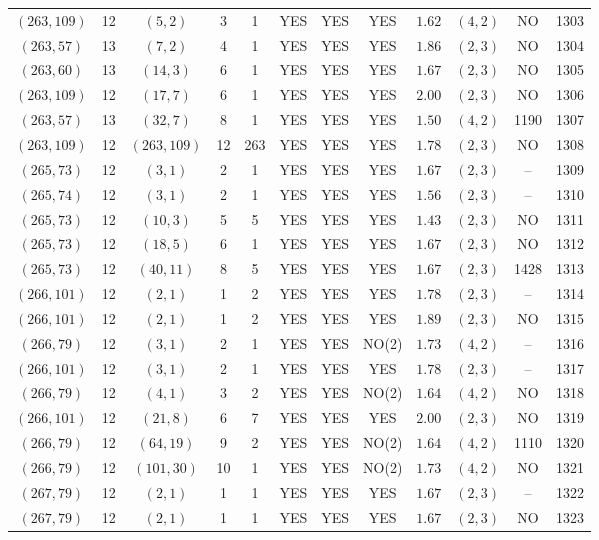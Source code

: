 \begin{longtable}{|c|c|c|c|c|c|c|c|c|c|c|c|}
$(263,109)$ & 12 & $(5,2)$ & 3 & 1 & YES & YES & YES & $1.62$ & $(4,2)$ & NO & 1303\\
$(263,57)$ & 13 & $(7,2)$ & 4 & 1 & YES & YES & YES & $1.86$ & $(2,3)$ & NO & 1304\\
$(263,60)$ & 13 & $(14,3)$ & 6 & 1 & YES & YES & YES & $1.67$ & $(2,3)$ & NO & 1305\\
$(263,109)$ & 12 & $(17,7)$ & 6 & 1 & YES & YES & YES & $2.00$ & $(2,3)$ & NO & 1306\\
$(263,57)$ & 13 & $(32,7)$ & 8 & 1 & YES & YES & YES & $1.50$ & $(4,2)$ & 1190 & 1307\\
$(263,109)$ & 12 & $(263,109)$ & 12 & 263 & YES & YES & YES & $1.78$ & $(2,3)$ & NO & 1308\\
$(265,73)$ & 12 & $(3,1)$ & 2 & 1 & YES & YES & YES & $1.67$ & $(2,3)$ & -- & 1309\\
$(265,74)$ & 12 & $(3,1)$ & 2 & 1 & YES & YES & YES & $1.56$ & $(2,3)$ & -- & 1310\\
$(265,73)$ & 12 & $(10,3)$ & 5 & 5 & YES & YES & YES & $1.43$ & $(2,3)$ & NO & 1311\\
$(265,73)$ & 12 & $(18,5)$ & 6 & 1 & YES & YES & YES & $1.67$ & $(2,3)$ & NO & 1312\\
$(265,73)$ & 12 & $(40,11)$ & 8 & 5 & YES & YES & YES & $1.67$ & $(2,3)$ & 1428 & 1313\\
$(266,101)$ & 12 & $(2,1)$ & 1 & 2 & YES & YES & YES & $1.78$ & $(2,3)$ & -- & 1314\\
$(266,101)$ & 12 & $(2,1)$ & 1 & 2 & YES & YES & YES & $1.89$ & $(2,3)$ & NO & 1315\\
$(266,79)$ & 12 & $(3,1)$ & 2 & 1 & YES & YES & NO(2) & $1.73$ & $(4,2)$ & -- & 1316\\
$(266,101)$ & 12 & $(3,1)$ & 2 & 1 & YES & YES & YES & $1.78$ & $(2,3)$ & -- & 1317\\
$(266,79)$ & 12 & $(4,1)$ & 3 & 2 & YES & YES & NO(2) & $1.64$ & $(4,2)$ & NO & 1318\\
$(266,101)$ & 12 & $(21,8)$ & 6 & 7 & YES & YES & YES & $2.00$ & $(2,3)$ & NO & 1319\\
$(266,79)$ & 12 & $(64,19)$ & 9 & 2 & YES & YES & NO(2) & $1.64$ & $(4,2)$ & 1110 & 1320\\
$(266,79)$ & 12 & $(101,30)$ & 10 & 1 & YES & YES & NO(2) & $1.73$ & $(4,2)$ & NO & 1321\\
$(267,79)$ & 12 & $(2,1)$ & 1 & 1 & YES & YES & YES & $1.67$ & $(2,3)$ & -- & 1322\\
$(267,79)$ & 12 & $(2,1)$ & 1 & 1 & YES & YES & YES & $1.67$ & $(2,3)$ & NO & 1323\\

\end{longtable}

